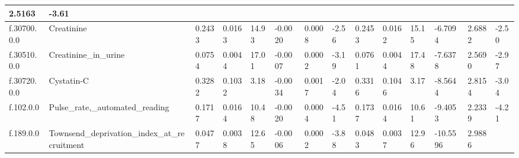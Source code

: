 \begin{longtable}{llllllllllllll}
  \multicolumn{1}{l|}{2.5163} &
  \multicolumn{1}{l|}{-3.61} \\ \hline
\multicolumn{1}{|l|}{f.30700.0.0} &
  \multicolumn{1}{l|}{Creatinine} &
  \multicolumn{1}{l|}{0.2433} &
  \multicolumn{1}{l|}{0.0163} &
  \multicolumn{1}{l|}{14.93} &
  \multicolumn{1}{l|}{-0.0020} &
  \multicolumn{1}{l|}{0.0008} &
  \multicolumn{1}{l|}{-2.56} &
  \multicolumn{1}{l|}{0.2453} &
  \multicolumn{1}{l|}{0.0162} &
  \multicolumn{1}{l|}{15.15} &
  \multicolumn{1}{l|}{-6.7094} &
  \multicolumn{1}{l|}{2.6882} &
  \multicolumn{1}{l|}{-2.50} \\ \hline
\multicolumn{1}{|l|}{f.30510.0.0} &
  \multicolumn{1}{l|}{Creatinine\_in\_urine} &
  \multicolumn{1}{l|}{0.0754} &
  \multicolumn{1}{l|}{0.0044} &
  \multicolumn{1}{l|}{17.01} &
  \multicolumn{1}{l|}{-0.0007} &
  \multicolumn{1}{l|}{0.0002} &
  \multicolumn{1}{l|}{-3.19} &
  \multicolumn{1}{l|}{0.0761} &
  \multicolumn{1}{l|}{0.0044} &
  \multicolumn{1}{l|}{17.48} &
  \multicolumn{1}{l|}{-7.6378} &
  \multicolumn{1}{l|}{2.5690} &
  \multicolumn{1}{l|}{-2.97} \\ \hline
\multicolumn{1}{|l|}{f.30720.0.0} &
  \multicolumn{1}{l|}{Cystatin-C} &
  \multicolumn{1}{l|}{0.3282} &
  \multicolumn{1}{l|}{0.1032} &
  \multicolumn{1}{l|}{3.18} &
  \multicolumn{1}{l|}{-0.0034} &
  \multicolumn{1}{l|}{0.0017} &
  \multicolumn{1}{l|}{-2.04} &
  \multicolumn{1}{l|}{0.3316} &
  \multicolumn{1}{l|}{0.1046} &
  \multicolumn{1}{l|}{3.17} &
  \multicolumn{1}{l|}{-8.5644} &
  \multicolumn{1}{l|}{2.8154} &
  \multicolumn{1}{l|}{-3.04} \\ \hline
\multicolumn{1}{|l|}{f.102.0.0} &
  \multicolumn{1}{l|}{Pulse\_rate,\_automated\_reading} &
  \multicolumn{1}{l|}{0.1717} &
  \multicolumn{1}{l|}{0.0164} &
  \multicolumn{1}{l|}{10.48} &
  \multicolumn{1}{l|}{-0.0020} &
  \multicolumn{1}{l|}{0.0004} &
  \multicolumn{1}{l|}{-4.51} &
  \multicolumn{1}{l|}{0.1737} &
  \multicolumn{1}{l|}{0.0164} &
  \multicolumn{1}{l|}{10.61} &
  \multicolumn{1}{l|}{-9.4053} &
  \multicolumn{1}{l|}{2.2339} &
  \multicolumn{1}{l|}{-4.21} \\ \hline
\multicolumn{1}{|l|}{f.189.0.0} &
  \multicolumn{1}{l|}{Townsend\_deprivation\_index\_at\_recruitment} &
  \multicolumn{1}{l|}{0.0477} &
  \multicolumn{1}{l|}{0.0038} &
  \multicolumn{1}{l|}{12.65} &
  \multicolumn{1}{l|}{-0.0006} &
  \multicolumn{1}{l|}{0.0002} &
  \multicolumn{1}{l|}{-3.88} &
  \multicolumn{1}{l|}{0.0483} &
  \multicolumn{1}{l|}{0.0037} &
  \multicolumn{1}{l|}{12.96} &
  \multicolumn{1}{l|}{-10.5596} &
  \multicolumn{1}{l|}{2.9886} &

\end{longtable}
